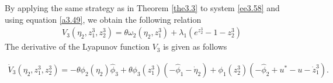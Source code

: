 \documentclass[10pt, a4paper]{amsart}
\makeatletter
\theoremstyle{plain}
\theoremstyle{definition}
\theoremstyle{remark}
\renewenvironment{proof}[1][\proofname]{\par
  \pushQED{\qed}%
  \normalfont \topsep6\p@\@plus6\p@\relax
  \trivlist
  \item[\hskip\labelsep
        \itshape
    #1\ \ref{#1}.]\ignorespaces
}{%
  \popQED\endtrivlist\@endpefalse
}
\numberwithin{equation}{section}
\makeatother
\begin{document}
\begin{proof}[of Theorem \ref{the3.4}]
By applying the same strategy as in Theorem \ref{the3.3} to system \eqref{ee3.58} and using equation \eqref{a3.49}, we obtain the following  relation 
\begin{align}
V_3(\eta_2,z^3_1,z^3_2)=\theta \omega_2(\eta_2,z^3_1)+ \lambda_1(e^{z^3_2}-1-z^3_2)
\end{align}
The derivative of the Lyapunov function $V_3$ is given as follows

\begin{align}
\dot V_3(\eta_2, z^3_1, z^3_2)= -\theta\phi_2(\eta_2)\hat{\phi}_3 + \theta\phi_3(z^3_1)(-\hat{\phi}_1-\dot\eta_2)+\phi_1(z^3_2)(-\hat{\phi}_2+u^*-u-\dot z^3_1).
\end{align}




\end{proof}
\end{document}

